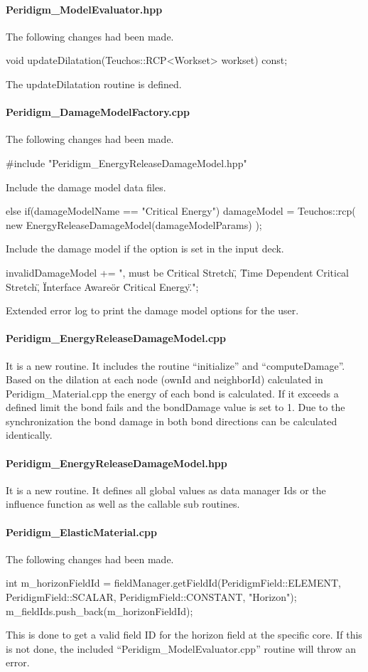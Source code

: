 \paragraph{Peridigm\_ModelEvaluator.hpp}
The following changes had been made.
\begin{code}
void updateDilatation(Teuchos::RCP<Workset> workset) const;
\end{code}
The updateDilatation routine is defined.

\paragraph{Peridigm\_DamageModelFactory.cpp}
The following changes had been made.
\begin{code}
#include "Peridigm_EnergyReleaseDamageModel.hpp"
\end{code}
Include the damage model data files.
\begin{code}
else if(damageModelName == "Critical Energy")
damageModel = 
  Teuchos::rcp( new EnergyReleaseDamageModel(damageModelParams) );
\end{code}
Include the damage model if the option is set in the input deck.
\begin{code}
invalidDamageModel += ", must be \"Critical Stretch\",
  \"Time Dependent Critical Stretch\", \"Interface Aware\" 
  or \"Critical Energy\".\n";
\end{code}
Extended error log to print the damage model options for the user.
\paragraph{Peridigm\_EnergyReleaseDamageModel.cpp}
It is a new routine. It includes the routine ``initialize'' and ``computeDamage''. Based on the dilation  at each node (ownId and neighborId) calculated in Peridigm\_Material.cpp the energy of each bond is calculated. If it exceeds a defined limit the bond fails and the bondDamage value is set to 1. Due to the synchronization the bond damage in both bond directions can be calculated identically. 
\paragraph{Peridigm\_EnergyReleaseDamageModel.hpp}
It is a new routine. It defines all global values as data manager Ids or the influence function as well as the callable sub routines.
\paragraph{Peridigm\_ElasticMaterial.cpp}
The following changes had been made.
\begin{code}
int m_horizonFieldId = fieldManager.getFieldId(PeridigmField::ELEMENT,
  PeridigmField::SCALAR, PeridigmField::CONSTANT, "Horizon");
m_fieldIds.push_back(m_horizonFieldId);
\end{code} 
This is done to get a valid field ID for the horizon field at the specific core. If this is not done, the included ``Peridigm\_ModelEvaluator.cpp'' routine will throw an error.

